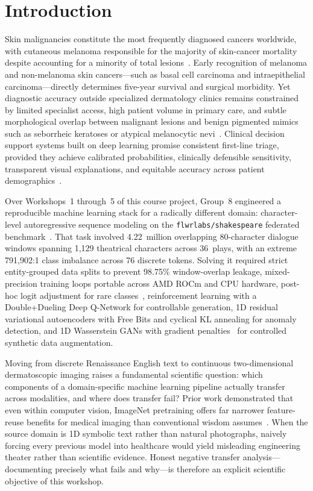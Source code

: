 \section{Introduction}
\label{sec:introduction}

Skin malignancies constitute the most frequently diagnosed cancers worldwide, with cutaneous melanoma responsible for the majority of skin-cancer mortality despite accounting for a minority of total lesions~\cite{Tschandl2018dataset,Esteva2017dermatologist}. Early recognition of melanoma and non-melanoma skin cancers—such as basal cell carcinoma and intraepithelial carcinoma—directly determines five-year survival and surgical morbidity. Yet diagnostic accuracy outside specialized dermatology clinics remains constrained by limited specialist access, high patient volume in primary care, and subtle morphological overlap between malignant lesions and benign pigmented mimics such as seborrheic keratoses or atypical melanocytic nevi~\cite{Tschandl2019comparison,Brinker2019deep}. Clinical decision support systems built on deep learning promise consistent first-line triage, provided they achieve calibrated probabilities, clinically defensible sensitivity, transparent visual explanations, and equitable accuracy across patient demographics~\cite{Esteva2019guide,OakdenRayner2020hidden}.

Over Workshops~1 through~5 of this course project, Group~8 engineered a reproducible machine learning stack for a radically different domain: character-level autoregressive sequence modeling on the \texttt{flwrlabs/shakespeare} federated benchmark~\cite{Caldas2018leaf}. That task involved 4.22~million overlapping 80-character dialogue windows spanning 1,129 theatrical characters across 36~plays, with an extreme 791,902:1 class imbalance across 76 discrete tokens. Solving it required strict entity-grouped data splits to prevent 98.75\% window-overlap leakage, mixed-precision training loops portable across AMD ROCm and CPU hardware, post-hoc logit adjustment for rare classes~\cite{Menon2020long}, reinforcement learning with a Double+Dueling Deep Q-Network for controllable generation, 1D residual variational autoencoders with Free Bits and cyclical KL annealing for anomaly detection, and 1D Wasserstein GANs with gradient penalties~\cite{Gulrajani2017improved} for controlled synthetic data augmentation.

Moving from discrete Renaissance English text to continuous two-dimensional dermatoscopic imaging raises a fundamental scientific question: which components of a domain-specific machine learning pipeline actually transfer across modalities, and where does transfer fail? Prior work demonstrated that even within computer vision, ImageNet pretraining offers far narrower feature-reuse benefits for medical imaging than conventional wisdom assumes~\cite{Raghu2019transfusion,Matsoukas2022what}. When the source domain is 1D symbolic text rather than natural photographs, naively forcing every previous model into healthcare would yield misleading engineering theater rather than scientific evidence. Honest negative transfer analysis—documenting precisely what fails and why—is therefore an explicit scientific objective of this workshop.

